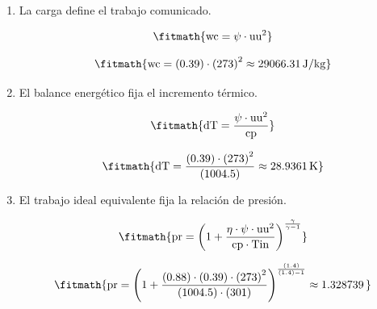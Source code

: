 \begin{enumerate}

\item La carga define el trabajo comunicado.

\[\fitmath{\mathrm{wc}=\psi\cdot {\mathrm{uu}}^{2}}\]

\[\fitmath{\mathrm{wc}=(0.39)\cdot {(273)}^{2}\approx 29066.31\,\mathrm{J/kg}}\]

\item El balance energético fija el incremento térmico.

\[\fitmath{\mathrm{dT}=\frac{\psi\cdot {\mathrm{uu}}^{2}}{\mathrm{cp}}}\]

\[\fitmath{\mathrm{dT}=\frac{(0.39)\cdot {(273)}^{2}}{(1004.5)}\approx 28.9361\,\mathrm{K}}\]

\item El trabajo ideal equivalente fija la relación de presión.

\[\fitmath{\mathrm{pr}={\left(1+\frac{\eta\cdot \psi\cdot {\mathrm{uu}}^{2}}{\mathrm{cp}\cdot \mathrm{Tin}}\right)}^{\frac{\gamma}{\gamma-1}}}\]

\[\fitmath{\mathrm{pr}={\left(1+\frac{(0.88)\cdot (0.39)\cdot {(273)}^{2}}{(1004.5)\cdot (301)}\right)}^{\frac{(1.4)}{(1.4)-1}}\approx 1.328739\,}\]

\end{enumerate}
